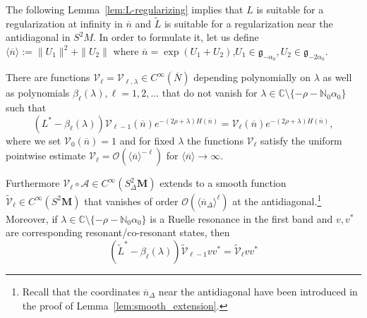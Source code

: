 \documentclass[AHL, Unicode, longabstracts, published]{cedram}
\newcommand{\mc}{\mathcal}
\newcommand{\cc}{\mathbb{C}}
\newcommand{\til}{\widetilde}
\newcommand{\N}{\mathbb{N}}
\newcommand{\g}{\mathfrak g}
\newcommand{\bn}{{\overline{n}}}
\newcommand{\bN}{{\overline{N}}}
\begin{document}
The following Lemma~\ref{lem:L-regularizing} implies that $L$ is suitable for a regularization at infinity in $\bn$ and $\til L$ is suitable for a regularization near the antidiagonal in $S^2M$. In order to formulate it, let us define $\langle \bn\rangle:= \|U_1\|^2+\|U_2\|$ where $ \bn=\exp(U_1+U_2)$,\linebreak$U_1\in\g_{-\alpha_0}, U_2\in\g_{-2\alpha_0}$.

\begin{lemm}\label{lem:L-regularizing}
There are functions $\mathcal V_{\ell}=\mathcal V_{\ell,\lambda} \in C^\infty(\bN)$ depending polynomially on $\lambda$ as well as polynomials $\beta_\ell(\lambda), \ell=1,2,\ldots$ that do not vanish for $\lambda\in\cc\setminus\{-\rho - \N_0\alpha_0\}$ such that
\begin{equation}\label{eq:L-regularizing}
(L^*-\beta_\ell(\lambda)) \mathcal V_{\ell-1}(\bn)e^{-(2\rho+\lambda)H(\bn)} =
\mathcal V_\ell(\bn)e^{-(2\rho+\lambda)H(\bn)},
\end{equation}
where we set $\mathcal V_0(\bn)=1$ and for fixed $\lambda$ the functions $\mathcal V_\ell$ satisfy the uniform pointwise estimate $\mc{V}_\ell= \mc O(\langle \bn\rangle^{-\ell})$ for $\langle \bn\rangle \to\infty$.

Furthermore $\mathcal V_\ell \circ \mathcal A\in C^\infty(S^2_\Delta \mathbf M)$ extends to a smooth function $\til{\mathcal V}_\ell \in C^\infty(S^2\mathbf M)$ that vanishes of order $\mc{O}(\langle\bn_\Delta\rangle^\ell)$ at the antidiagonal.\footnote{Recall that the coordinates $\bn_\Delta$ near the antidiagonal have been introduced in the proof of Lemma~\ref{lem:smooth_extension}.} Moreover, if $\lambda\in\cc\setminus\{-\rho - \N_0\alpha_0\}$ is a Ruelle resonance in the first band and $v,v^*$ are corresponding resonant/co-resonant states, then
\begin{equation}\label{eq:Ltilde-regularizing}
\left(\til L^* - \beta_\ell(\lambda)\right)\til{\mathcal V}_{\ell-1}vv^* =
\til{\mathcal V}_\ell vv^*
\end{equation}
\end{lemm}
\end{document}

